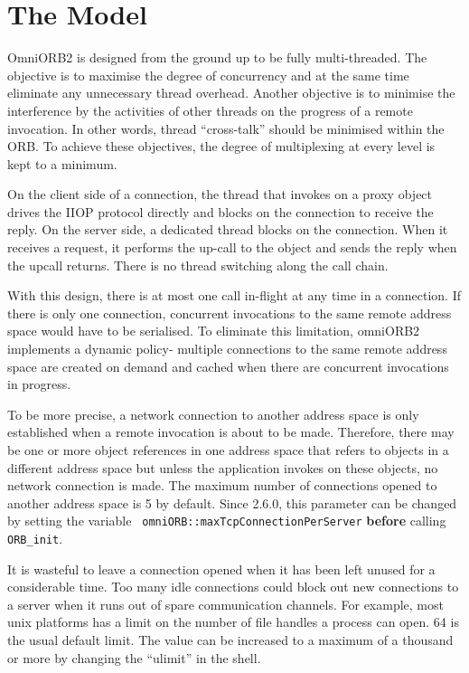 \documentclass[11pt,twoside,onecolumn]{book}
\begin{document}
\section{The Model}

OmniORB2 is designed from the ground up to be fully multi-threaded. The
objective is to maximise the degree of concurrency and at the same time
eliminate any unnecessary thread overhead. Another objective is to minimise
the interference by the activities of other threads on the progress of a
remote invocation. In other words, thread ``cross-talk'' should be
minimised within the ORB. To achieve these objectives, the degree of
multiplexing at every level is kept to a minimum.

On the client side of a connection, the thread that invokes on a proxy
object drives the IIOP protocol directly and blocks on the connection to
receive the reply. On the server side, a dedicated thread blocks on the
connection. When it receives a request, it performs the up-call to the
object and sends the reply when the upcall returns. There
is no thread switching along the call chain.

With this design, there is at most one call in-flight at any time in a
connection. If there is only one connection, concurrent invocations to the
same remote address space would have to be serialised. To eliminate this
limitation, omniORB2 implements a dynamic policy- multiple connections to
the same remote address space are created on demand and cached when there
are concurrent invocations in progress.

To be more precise, a network connection to another address space is only
established when a remote invocation is about to be made. Therefore, there
may be one or more object references in one address space that refers to
objects in a different address space but unless the application invokes on
these objects, no network connection is made. The maximum number of
connections opened to another address space is 5 by default. Since 2.6.0,
this parameter can be changed by setting the variable {\tt
omniORB::maxTcpConnectionPerServer} {\bf before} calling {\tt ORB\_init}.

It is wasteful to leave a connection opened when it has been left unused
for a considerable time. Too many idle connections could block out new
connections to a server when it runs out of spare communication
channels. For example, most unix platforms has a limit on the number of
file handles a process can open. 64 is the usual default limit. The
value can be increased to a maximum of a thousand or more by changing the
``ulimit'' in the shell.
\end{document}

